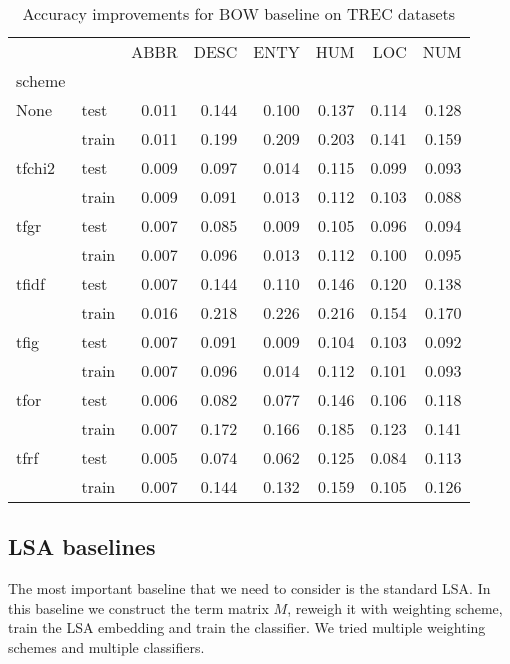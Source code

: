 \begin{table}[H]
\begin{center}

\begin{tabular}{llrrrrrr}
\toprule
{} &&  ABBR &  DESC &  ENTY &  HUM &  LOC &  NUM \\
scheme &  & & & &&&\\
\midrule
None & test & 0.011 & 0.144 & 0.100 &0.137 &0.114 &0.128 \\
{} & train & 0.011 & 0.199 & 0.209 &0.203 &0.141 &0.159 \\
tfchi2 & test & 0.009 & 0.097 & 0.014 &0.115 &0.099 &0.093 \\
{} & train & 0.009 & 0.091 & 0.013 &0.112 &0.103 &0.088 \\
tfgr & test & 0.007 & 0.085 & 0.009 &0.105 &0.096 &0.094 \\
{} & train & 0.007 & 0.096 & 0.013 &0.112 &0.100 &0.095 \\
tfidf & test & 0.007 & 0.144 & 0.110 &0.146 &0.120 &0.138 \\
{} & train & 0.016 & 0.218 & 0.226 &0.216 &0.154 &0.170 \\
tfig & test & 0.007 & 0.091 & 0.009 &0.104 &0.103 &0.092 \\
{} & train & 0.007 & 0.096 & 0.014 &0.112 &0.101 &0.093 \\
tfor & test & 0.006 & 0.082 & 0.077 &0.146 &0.106 &0.118 \\
{} & train & 0.007 & 0.172 & 0.166 &0.185 &0.123 &0.141 \\
tfrf & test & 0.005 & 0.074 & 0.062 &0.125 &0.084 &0.113 \\
{} & train & 0.007 & 0.144 & 0.132 &0.159 &0.105 &0.126 \\
\bottomrule
\end{tabular}

\caption[Accuracy improvements for BOW baseline on TREC datasets]{Accuracy improvements for BOW baseline on TREC datasets}
\label{}
\end{center}
\end{table}

    
    
    
    \subsection{LSA baselines} \label{sec:lsa:baseline}
    The most important baseline that we need to consider is the standard LSA.
    In this baseline we construct the term matrix $M$, reweigh it with weighting scheme, train the LSA embedding and train the classifier.
    We tried multiple weighting schemes and multiple classifiers.
    
